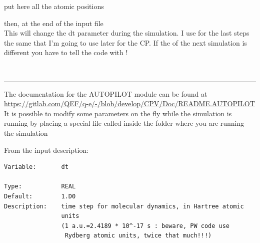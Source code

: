 \documentclass[landscape]{foils}
\begin{document}
\begin{minipage}{0.5\textwidth}
put here all the atomic positions\\
\end{minipage}
\begin{minipage}{0.5\textwidth}
then, at the end of the input file\\
	This will change the dt parameter during the simulation. I use for the last steps the same  that I'm going to use later for the CP. If the  of the next simulation is different you have to tell the code with !
\end{minipage}\\

\hrule The documentation for the AUTOPILOT module can be found at
\url{https://gitlab.com/QEF/q-e/-/blob/develop/CPV/Doc/README.AUTOPILOT}
It is possible to modify some parameters on the fly while the simulation is running by placing a special file called  inside the folder where you are running the simulation

From the  input description:
\begin{verbatim}
Variable:       dt

Type:           REAL
Default:        1.D0
Description:    time step for molecular dynamics, in Hartree atomic
                units
                (1 a.u.=2.4189 * 10^-17 s : beware, PW code use
                 Rydberg atomic units, twice that much!!!)

\end{verbatim}
\end{document}
